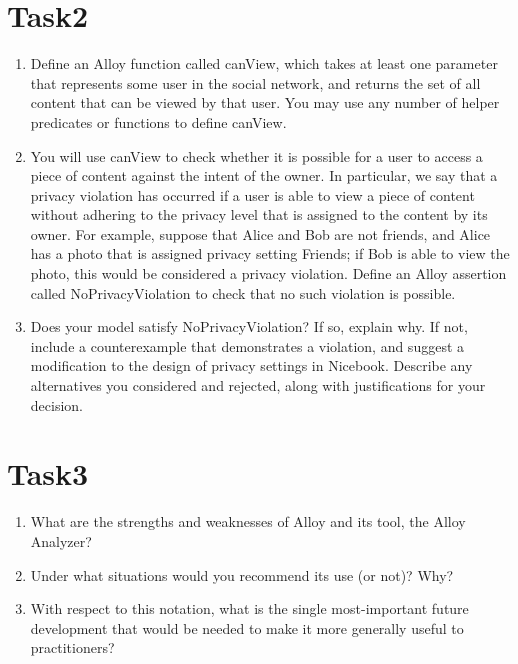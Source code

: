 \documentclass[titlepage]{article}
\begin{document}
\section*{Task2}
\begin{enumerate}
    \item Define an Alloy function called canView, which takes at least one parameter that represents some user in the
    social network, and returns the set of all content that can be viewed by that user. You may use any number of
    helper predicates or functions to define canView.
    \item You will use canView to check whether it is possible for a user to access a piece of content against the intent of
    the owner. In particular, we say that a privacy violation has occurred if a user is able to view a piece of content
    without adhering to the privacy level that is assigned to the content by its owner. For example, suppose that Alice
    and Bob are not friends, and Alice has a photo that is assigned privacy setting Friends; if Bob is able to view the
    photo, this would be considered a privacy violation. Define an Alloy assertion called NoPrivacyViolation
    to check that no such violation is possible.
    \item Does your model satisfy NoPrivacyViolation? If so, explain why. If not, include a counterexample that
    demonstrates a violation, and suggest a modification to the design of privacy settings in Nicebook. Describe
    any alternatives you considered and rejected, along with justifications for your decision.
\end{enumerate}

\section*{Task3}
\begin{enumerate}
    \item What are the strengths and weaknesses of Alloy and its tool, the Alloy Analyzer?
    \item Under what situations would you recommend its use (or not)? Why?
    \item With respect to this notation, what is the single most-important future development that would be needed to
    make it more generally useful to practitioners?
\end{enumerate}
\end{document}
